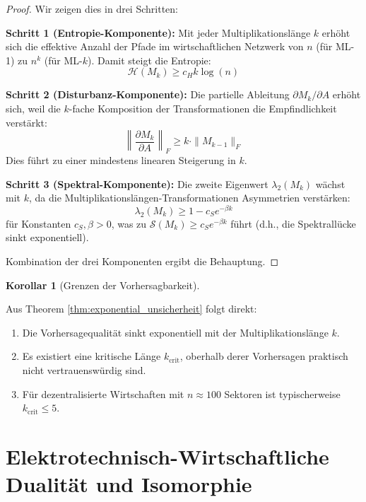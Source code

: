 \documentclass[a4paper,12pt]{article}
\theoremstyle{definition}
\newtheorem{korollar}{Korollar}
\begin{document}
\begin{proof}

Wir zeigen dies in drei Schritten:

\textbf{Schritt 1 (Entropie-Komponente):}
Mit jeder Multiplikationslänge $k$ erhöht sich die effektive Anzahl der Pfade im wirtschaftlichen Netzwerk von $n$ (für ML-1) zu $n^k$ (für ML-$k$). Damit steigt die Entropie:
\[
\mathcal{H}(M_k) \geq c_H k \log(n)
\]

\textbf{Schritt 2 (Disturbanz-Komponente):}
Die partielle Ableitung $\partial M_k / \partial A$ erhöht sich, weil die $k$-fache Komposition der Transformationen die Empfindlichkeit verstärkt:
\[
\left\|\frac{\partial M_k}{\partial A}\right\|_F \geq k \cdot \|M_{k-1}\|_F
\]
Dies führt zu einer mindestens linearen Steigerung in $k$.

\textbf{Schritt 3 (Spektral-Komponente):}
Die zweite Eigenwert $\lambda_2(M_k)$ wächst mit $k$, da die Multiplikationslängen-Transformationen Asymmetrien verstärken:
\[
\lambda_2(M_k) \geq 1 - c_S e^{-\beta k}
\]
für Konstanten $c_S, \beta > 0$, was zu $\mathcal{S}(M_k) \geq c_S e^{-\beta k}$ führt (d.h., die Spektrallücke sinkt exponentiell).

Kombination der drei Komponenten ergibt die Behauptung.

\end{proof}

\begin{korollar}[Grenzen der Vorhersagbarkeit]
\label{kor:vorhersagbarkeit}

Aus Theorem \ref{thm:exponential_unsicherheit} folgt direkt:

\begin{enumerate}
\item Die Vorhersagequalität sinkt exponentiell mit der Multiplikationslänge $k$.
\item Es existiert eine kritische Länge $k_{\text{crit}}$, oberhalb derer Vorhersagen praktisch nicht vertrauenswürdig sind.
\item Für dezentralisierte Wirtschaften mit $n \approx 100$ Sektoren ist typischerweise $k_{\text{crit}} \leq 5$.
\end{enumerate}

\end{korollar}

\section{Elektrotechnisch-Wirtschaftliche Dualität und Isomorphie}
\end{document}
